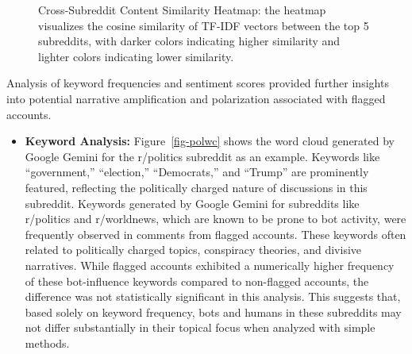 \documentclass[
  12pt,
  letterpaper,
  DIV=11,
  numbers=noendperiod]{scrartcl}
\providecommand{\tightlist}{%
  \setlength{\itemsep}{0pt}\setlength{\parskip}{0pt}}\usepackage{longtable,booktabs,array}
\begin{document}
\begin{figure}


\caption{\label{fig-cross}Cross-Subreddit Content Similarity Heatmap:
the heatmap visualizes the cosine similarity of TF-IDF vectors between
the top 5 subreddits, with darker colors indicating higher similarity
and lighter colors indicating lower similarity.}

\end{figure}%

Analysis of keyword frequencies and sentiment scores provided further
insights into potential narrative amplification and polarization
associated with flagged accounts.

\begin{itemize}
\tightlist
\item
  \textbf{Keyword Analysis:} Figure~\ref{fig-polwc} shows the word cloud
  generated by Google Gemini for the r/politics subreddit as an example.
  Keywords like ``government,'' ``election,'' ``Democrats,'' and
  ``Trump'' are prominently featured, reflecting the politically charged
  nature of discussions in this subreddit. Keywords generated by Google
  Gemini for subreddits like r/politics and r/worldnews, which are known
  to be prone to bot activity, were frequently observed in comments from
  flagged accounts. These keywords often related to politically charged
  topics, conspiracy theories, and divisive narratives. While flagged
  accounts exhibited a numerically higher frequency of these
  bot-influence keywords compared to non-flagged accounts, the
  difference was not statistically significant in this analysis. This
  suggests that, based solely on keyword frequency, bots and humans in
  these subreddits may not differ substantially in their topical focus
  when analyzed with simple methods.
\end{itemize}
\end{document}
